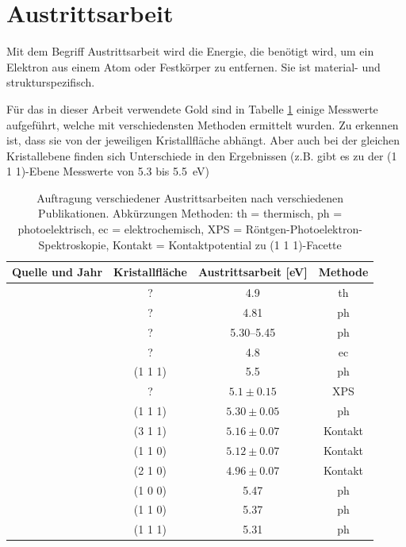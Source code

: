 \documentclass[bachelor,       %
               twoside,        %
               BCOR10mm,       %
               english,ngerman, %
               ]{GAUBM}
\begin{document}
\section{Austrittsarbeit}
Mit dem Begriff Austrittsarbeit wird die Energie, die ben\"otigt wird, um ein Elektron aus einem Atom oder Festk\"orper zu entfernen.
Sie ist material- und strukturspezifisch. 

F\"ur das in dieser Arbeit verwendete Gold sind in Tabelle \ref{tab:austrittsarbeit} einige Messwerte aufgef\"uhrt, welche mit verschiedensten Methoden ermittelt wurden.
Zu erkennen ist, dass sie von der jeweiligen Kristallfl\"ache abh\"angt.
Aber auch bei der gleichen Kristallebene finden sich Unterschiede in den Ergebnissen (z.B. gibt es zu der (1 1 1)-Ebene Messwerte von 5.3 bis \SI{5.5}{\eV})


\begin{table}[h!]
\centering
\begin{tabular}{|c|c|c|c|}
\hline 
Quelle und Jahr& Kristallfläche & Austrittsarbeit [\unit{eV}] & Methode \\ 
\hline\hline
\citet[1931]{fowler_1931} & ? 			& 4.9 				& th \\\hline
\citet[1932]{dubridge_further_1932} & ? 	& 4.81 			& ph \\\hline

\citet[1966]{sachtler_work_1966} & ? 	& \numrange{5.30}{5.45} & ph \\\hline

\citet[1974]{trasatti_operative_1974} & ? 	& 4.8 		& ec \\\hline
\citet[1982]{pescia_spin_1982} & (1 1 1) 	& 5.5 		& ph \\\hline
\citet[1986]{koetz_1986} & ? 				& $5.1\pm0.15$ 		& XPS \\\hline
\citet[1990]{lecoeur_1990}	& (1 1 1) 		& $5.30\pm0.05$ 	& ph \\
					& (3 1 1) 		& $5.16\pm0.07$ 	& Kontakt \\
					& (1 1 0) 		& $5.12\pm0.07$ 	& Kontakt \\
					& (2 1 0) 		& $4.96\pm0.07$ 	& Kontakt \\\hline
\citet[2004]{crc}		&(1 0 0) 			& 5.47 				& ph \\
 				&(1 1 0) 			& 5.37 				& ph \\
				&(1 1 1) 			& 5.31 				& ph \\\hline
\end{tabular} 
\caption{Auftragung verschiedener Austrittsarbeiten nach verschiedenen Publikationen. Abkürzungen Methoden: th = thermisch, ph = photoelektrisch, ec = elektrochemisch, XPS = Röntgen-Photoelektron-Spektroskopie, Kontakt = Kontaktpotential zu (1 1 1)-Facette}
\label{tab:austrittsarbeit}
\end{table}
\end{document}
